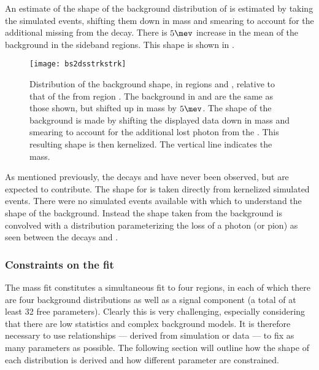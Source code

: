 An estimate of the shape of the background distribution of \bstodsstrkstrk is estimated by taking
the simulated \bstodskstrk events, shifting them down in mass and smearing to account for the
additional missing \photon from the \Dss decay.
There is $5\mev$ increase in the mean of the background in the \phii sideband regions.
This shape is shown in .

\begin{figure}
  \begin{center}
    \texttt{[image: bs2dsstrkstrk]}
    \caption[Shapes of background contributions of \bstodsstrkstrk]
    {\small
      Distribution of the \bstodsstrkstrk background shape, in regions \rA and \rB, relative to
      that of the \bstodskstrk from region \rA.
      The \bstodsstrkstrk background in \rC and \rD are the same as those shown, but shifted up in
      mass by $5\mev$.
      The shape of the \bstodsstrkstrk background is made by shifting the displayed data down in
      mass and smearing to account for the additional lost photon from the \Dss.
      This resulting shape is then kernelized.
      The vertical line indicates the \Bp mass.
    }
    \label{fig:dsphi:bstodsstrkstrk}
  \end{center}
\end{figure}

As mentioned previously, the decays \bstodskstrk and \bstodsstrkstrk have never been observed, but
are expected to contribute.
The shape for \bstodskstrk is taken directly from kernelized simulated events.
There were no simulated events available with which to understand the shape of the \bstodsstrkstrk
background.
Instead the shape taken from the \bstodskstrk background is convolved with a distribution
parameterizing the loss of a photon (or pion) as seen between the decays \btodsstrphi and
\bstodskstrk.




\subsubsection{Constraints on the fit}
The mass fit constitutes a simultaneous fit to four regions, in each of which there are four
background distributions as well as a signal component (a total of at least 32 free parameters).
Clearly this is very challenging, especially considering that there are low statistics and complex
background models.
It is therefore necessary to use relationships --- derived from simulation or data --- to fix as
many parameters as possible.
The following section will outline how the shape of each distribution is derived and how different
parameter are constrained.

